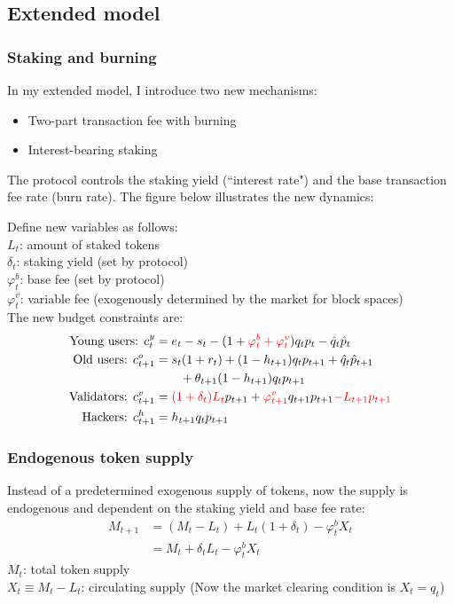 \documentclass[12pt]{article}
\begin{document}
\subsection{Extended model}
\label{sec:extensions}
\subsubsection{Staking and burning}
In my extended model, I introduce two new mechanisms:
\begin{itemize}
    \item Two-part transaction fee with burning
    \item Interest-bearing staking
\end{itemize}
The protocol controls the staking yield (``interest rate") and the base transaction fee rate (burn rate). The figure below illustrates the new dynamics:



\noindent Define new variables as follows:\\
$L_t$: amount of staked tokens \\
$\delta_t$: staking yield (set by protocol)\\
$\varphi_t^b$: base fee (set by protocol)\\
$\varphi_t^v$: variable fee (exogenously determined by the market for block spaces)\\

\noindent The new budget constraints are:
\begin{align}
    \text{Young users: } c_t^y &= e_t - s_t - (1+{\color{red} \varphi_t^b+\varphi_t^v}) q_t p_t - \hat{q}_t \hat{p}_t\\
    \text{Old users: } c_{t+1}^o &=  s_t (1+r_t) + (1-h_{t+1}) q_t p_{t+1} + \hat{q}_t \hat{p}_{t+1} \nonumber \\
     &\hspace{2em} + \theta_{t+1} (1-h_{t+1}) q_t p_{t+1}\\ 
    \text{Validators: } c_{t+1}^v &= {\color{red} (1+\delta_t) L_t} p_{t+1} + {\color{red} \varphi_{t+1}^v} q_{t+1} p_{t+1} {\color{red} - L_{t+1} p_{t+1} }\\
    \text{Hackers: } c_{t+1}^h &= h_{t+1} q_t p_{t+1}
\end{align}

\subsubsection{Endogenous token supply}
Instead of a predetermined exogenous supply of tokens, now the supply is endogenous and dependent on the staking yield and base fee rate:
\begin{align}
    M_{t+1} &= (M_t - L_t) + L_t (1 + \delta_t) - \varphi_t^b X_t \nonumber \\
    &= M_t + \delta_t L_t - \varphi_t^b X_t
\end{align}
$M_t$: total token supply\\
$X_t \equiv M_t - L_t$: circulating supply (Now the market clearing condition is $X_t=q_t$)\\
\end{document}
